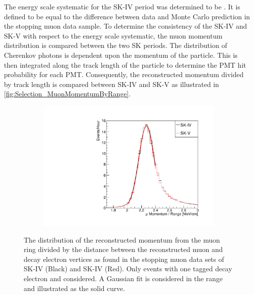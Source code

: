 The energy scale systematic for the SK-IV period was determined to be  \cite{sk_2017}. It is defined to be equal to the difference between data and Monte Carlo prediction in the stopping muon data sample. To determine the consistency of the SK-IV and SK-V with respect to the energy scale systematic, the muon momentum distribution is compared between the two SK periods. The distribution of Cherenkov photons is dependent upon the momentum of the particle. This is then integrated along the track length of the particle to determine the PMT hit probability for each PMT. Consequently, the reconstructed momentum divided by track length is compared between SK-IV and SK-V as illustrated in \autoref{fig:Selection_MuonMomentumByRange}.

\begin{figure}[h]
  \begin{subfigure}[t]{\textwidth}
    \includegraphics[width=\textwidth, trim={0mm 0mm 0mm 0mm}, clip, page=1]{Figures/Selections/MuonRangeComparison.pdf}
  \end{subfigure}
  \caption{The distribution of the reconstructed momentum from the muon ring divided by the distance between the reconstructed muon and decay electron vertices as found in the stopping muon data sets of SK-IV (Black) and SK-IV (Red). Only events with one tagged decay electron and considered. A Gaussian fit is considered in the range  and illustrated as the solid curve.}
  \label{fig:Selection_MuonMomentumByRange}
\end{figure}

